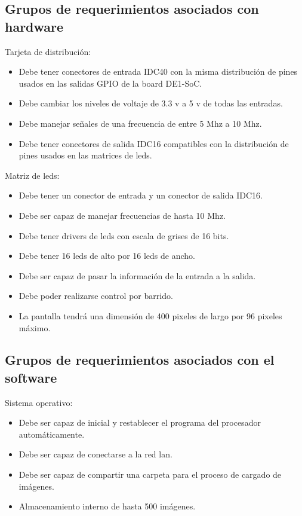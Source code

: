 \subsection{Grupos de requerimientos asociados con hardware}

Tarjeta de distribución:
\begin{itemize}
\item Debe tener conectores de entrada IDC40 con la misma distribución de pines usados en las salidas GPIO de la board DE1-SoC.
\item Debe cambiar los niveles de voltaje de 3.3 v a 5 v de todas las entradas. 
\item Debe manejar señales de una frecuencia de entre 5 Mhz a 10 Mhz.
\item Debe tener conectores de salida IDC16 compatibles con la distribución de pines usados en las matrices de leds.
\end{itemize}
Matriz de leds:
\begin{itemize}
\item Debe tener un conector de entrada y un conector de salida IDC16.
\item Debe ser capaz de manejar frecuencias de hasta 10 Mhz.
\item Debe tener drivers de leds con escala de grises de 16 bits.
\item Debe tener 16 leds de alto por 16 leds de ancho.
\item Debe ser capaz de pasar la información de la entrada a la salida.
\item Debe poder realizarse control por barrido. 
\item La pantalla tendrá una dimensión de 400 pixeles de largo por 96 pixeles máximo.
\end{itemize}

\subsection{Grupos de requerimientos asociados con el software}

Sistema operativo:
\begin{itemize}
\item Debe ser capaz de inicial y restablecer el programa del procesador automáticamente.
\item Debe ser capaz de conectarse a la red lan. 
\item Debe ser capaz de compartir una carpeta para el proceso de cargado de imágenes.
\item Almacenamiento interno de hasta 500 imágenes.
\end{itemize}

